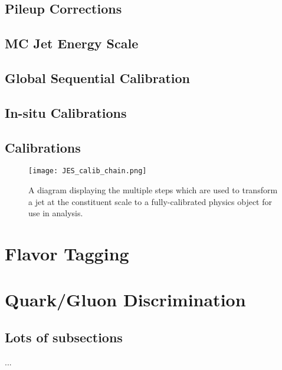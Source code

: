 \subsection{Pileup Corrections}

\subsection{MC Jet Energy Scale}

\subsection{Global Sequential Calibration}

\subsection{In-situ Calibrations}

\subsection{\LargeR Calibrations}



\begin{figure}
\centering
\texttt{[image: JES\_calib\_chain.png]}
\label{fig:jet-reconstruction:making-jets}
\caption{A diagram displaying the multiple steps which are used to transform a jet at the constituent scale to a fully-calibrated physics object for use in analysis.}
\end{figure}



\section{Flavor Tagging}

\section{Quark/Gluon Discrimination}
	\subsection{Lots of subsections}
		...